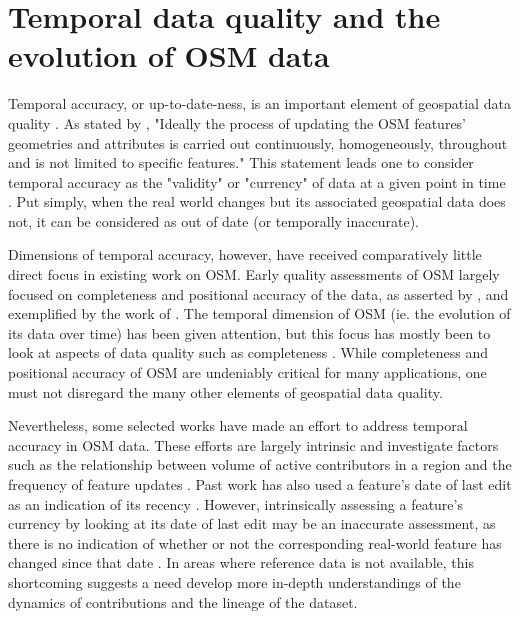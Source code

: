 \section{Temporal data quality and the evolution of OSM data}

Temporal accuracy, or up-to-date-ness, is an important element of geospatial data quality \parencite{van_oort_spatial_2006}. As stated by \textcite[p. 884]{barron_comprehensive_2014}, "Ideally the process of updating the OSM features’ geometries and attributes is carried out continuously, homogeneously, throughout and is not limited to speciﬁc features." This statement leads one to consider temporal accuracy as the "validity" or "currency" of data at a given point in time \parencite[p. 17]{van_oort_spatial_2006}. Put simply, when the real world changes but its associated geospatial data does not, it can be considered as out of date (or temporally inaccurate).	

Dimensions of temporal accuracy, however, have received comparatively little direct focus in existing work on OSM. Early quality assessments of OSM largely focused on completeness and positional accuracy of the data, as asserted by \textcite[p.83]{neis_recent_2014}, and exemplified by the work of \textcite{haklay_how_2010-1, haklay_how_2010, helbich_comparative_2012}. The temporal dimension of OSM (ie. the evolution of its data over time) has been given attention, but this focus has mostly been to look at aspects of data quality such as completeness \parencite{grochenig_estimating_2014}. While completeness and positional accuracy of OSM are undeniably critical for many applications, one must not disregard the many other elements of geospatial data quality. 

Nevertheless, some selected works have made an effort to address temporal accuracy in OSM data. These efforts are largely intrinsic and investigate factors such as the relationship between volume of active contributors in a region and the frequency of feature updates \parencite{girres_quality_2010}. Past work has also used a feature's date of last edit as an indication of its recency \parencite{minghini_open_2018, roick_technical_2012}. However, intrinsically assessing a feature’s currency by looking at its date of last edit may be an inaccurate assessment, as there is no indication of whether or not the corresponding real-world feature has changed since that date \parencite{barron_comprehensive_2014}. In areas where reference data is not available, this shortcoming suggests a need develop more in-depth understandings of the dynamics of contributions and the lineage of the dataset. 

